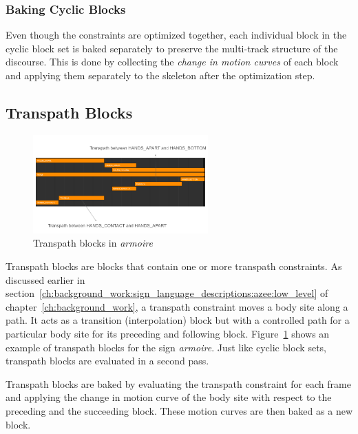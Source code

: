 \documentclass[../../main.tex]{subfiles}
\begin{document}
\subsubsection{Baking Cyclic Blocks}
\label{ch:multi_track:second_pass:cyclic_blocks:baking_cyclic_blocks}

Even though the constraints are optimized together, each individual block in the cyclic block set is baked separately to preserve the multi-track structure of the discourse. This is done by collecting the \emph{change in motion curves} of each block and applying them separately to the skeleton after the optimization step.

\subsection{Transpath Blocks}
\label{ch:multi_track:second_pass:transpath_blocks}

\begin{figure}[h]
    \centering
    \includegraphics[width=0.6\textwidth]{chapters/multi_track/images/transpath_blocks.png}
    \caption{Transpath blocks in \emph{armoire}}
    \label{fig:transpath_blocks}
\end{figure}

Transpath blocks are blocks that contain one or more transpath constraints. As discussed earlier in section~\ref{ch:background_work:sign_language_descriptions:azee:low_level} of chapter~\ref{ch:background_work}, a transpath constraint moves a body site along a path. It acts as a transition (interpolation) block but with a controlled path for a particular body site for its preceding and following block. Figure~\ref{fig:transpath_blocks} shows an example of transpath blocks for the sign \emph{armoire}. Just like cyclic block sets, transpath blocks are evaluated in a second pass.

Transpath blocks are baked by evaluating the transpath constraint for each frame and applying the change in motion curve of the body site with respect to the preceding and the succeeding block. These motion curves are then baked as a new block.
\end{document}
